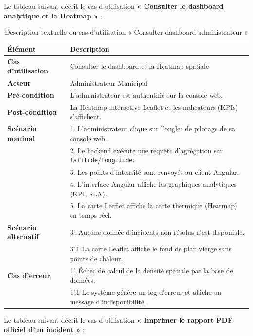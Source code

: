 Le tableau suivant décrit le cas d'utilisation \textbf{« Consulter le dashboard analytique et la Heatmap »} :

\begin{table}[H]
    \centering
    \caption{Description textuelle du cas d'utilisation « Consulter dashboard administrateur »}
    \label{tab:txt_dashboard_admin}
    \vspace{0.2cm}
    \small
    \begin{tabularx}{\textwidth}{|l|X|}
        \hline
        \textbf{Élément} & \textbf{Description} \\ \hline
        \textbf{Cas d’utilisation} & Consulter le dashboard et la Heatmap spatiale \\ \hline
        \textbf{Acteur} & Administrateur Municipal \\ \hline
        \textbf{Pré-condition} & L'administrateur est authentifié sur la console web. \\ \hline
        \textbf{Post-condition} & La Heatmap interactive Leaflet et les indicateurs (KPIs) s'affichent. \\ \hline
        \textbf{Scénario nominal} &
        1. L'administrateur clique sur l'onglet de pilotage de sa console web.\\
        & 2. Le backend exécute une requête d'agrégation sur \texttt{latitude}/\texttt{longitude}.\\
        & 3. Les points d'intensité sont renvoyés au client Angular.\\
        & 4. L'interface Angular affiche les graphiques analytiques (KPI, SLA).\\
        & 5. La carte Leaflet affiche la carte thermique (Heatmap) en temps réel. \\ \hline
        \textbf{Scénario alternatif} &
        3'. Aucune donnée d'incidents non résolus n'est disponible.\\
        & 3'.1 La carte Leaflet affiche le fond de plan vierge sans points de chaleur. \\ \hline
        \textbf{Cas d’erreur} &
        1'. Échec de calcul de la densité spatiale par la base de données.\\
        & 1'.1 Le système génère un log d'erreur et affiche un message d'indisponibilité. \\ \hline
    \end{tabularx}
\end{table}

Le tableau suivant décrit le cas d'utilisation \textbf{« Imprimer le rapport PDF officiel d'un incident »} :

